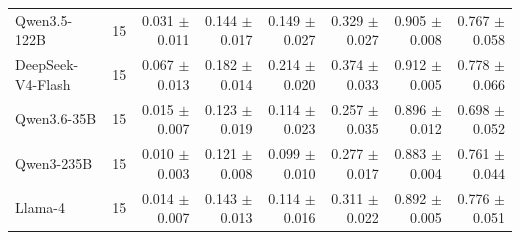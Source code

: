 \begin{table}[t]
\begin{tabular*}{\textwidth}{@{\extracolsep{\fill}}lrrrrrrr@{}}
Qwen3.5-122B & 15 & \shortstack[r]{0.031\\{\scriptsize $\pm$0.011}} & \shortstack[r]{0.144\\{\scriptsize $\pm$0.017}} & \shortstack[r]{0.149\\{\scriptsize $\pm$0.027}} & \shortstack[r]{0.329\\{\scriptsize $\pm$0.027}} & \shortstack[r]{0.905\\{\scriptsize $\pm$0.008}} & \shortstack[r]{0.767\\{\scriptsize $\pm$0.058}} \\
DeepSeek-V4-Flash & 15 & \shortstack[r]{0.067\\{\scriptsize $\pm$0.013}} & \shortstack[r]{0.182\\{\scriptsize $\pm$0.014}} & \shortstack[r]{0.214\\{\scriptsize $\pm$0.020}} & \shortstack[r]{0.374\\{\scriptsize $\pm$0.033}} & \shortstack[r]{0.912\\{\scriptsize $\pm$0.005}} & \shortstack[r]{0.778\\{\scriptsize $\pm$0.066}} \\
Qwen3.6-35B & 15 & \shortstack[r]{0.015\\{\scriptsize $\pm$0.007}} & \shortstack[r]{0.123\\{\scriptsize $\pm$0.019}} & \shortstack[r]{0.114\\{\scriptsize $\pm$0.023}} & \shortstack[r]{0.257\\{\scriptsize $\pm$0.035}} & \shortstack[r]{0.896\\{\scriptsize $\pm$0.012}} & \shortstack[r]{0.698\\{\scriptsize $\pm$0.052}} \\
Qwen3-235B & 15 & \shortstack[r]{0.010\\{\scriptsize $\pm$0.003}} & \shortstack[r]{0.121\\{\scriptsize $\pm$0.008}} & \shortstack[r]{0.099\\{\scriptsize $\pm$0.010}} & \shortstack[r]{0.277\\{\scriptsize $\pm$0.017}} & \shortstack[r]{0.883\\{\scriptsize $\pm$0.004}} & \shortstack[r]{0.761\\{\scriptsize $\pm$0.044}} \\
Llama-4 & 15 & \shortstack[r]{0.014\\{\scriptsize $\pm$0.007}} & \shortstack[r]{0.143\\{\scriptsize $\pm$0.013}} & \shortstack[r]{0.114\\{\scriptsize $\pm$0.016}} & \shortstack[r]{0.311\\{\scriptsize $\pm$0.022}} & \shortstack[r]{0.892\\{\scriptsize $\pm$0.005}} & \shortstack[r]{0.776\\{\scriptsize $\pm$0.051}} \\
\bottomrule
\end{tabular*}
\end{table}
